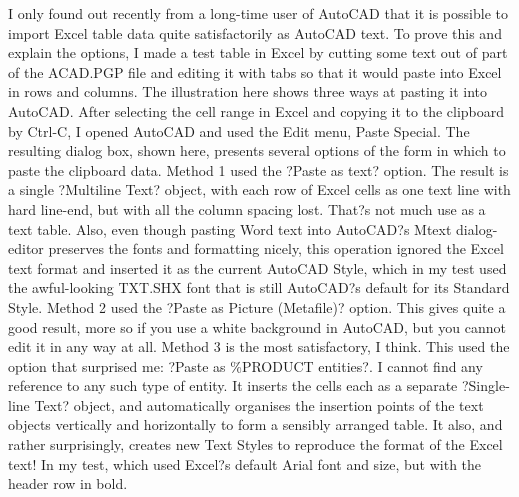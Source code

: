 \documentclass[a4paper]{article}
\begin{document}
{I only found out recently from a long-time user of AutoCAD that it is possible to import Excel table data quite satisfactorily as AutoCAD text. To prove this and explain the options, I made a test table in Excel by cutting some text out of part of the ACAD.PGP file and editing it with tabs so that it would paste into Excel in rows and columns. The illustration here shows three ways at pasting it into AutoCAD. After selecting the cell range in Excel and copying it to the clipboard by Ctrl-C, I opened AutoCAD and used the Edit menu, Paste Special. The resulting dialog box, shown here, presents several options of the form in which to paste the clipboard data.
Method 1 used the ?Paste as text? option. The result is a single ?Multiline Text? object, with each row of Excel cells as one text line with hard line-end, but with all the column spacing lost. That?s not much use as a text table. Also, even though pasting Word text into AutoCAD?s Mtext dialog-editor preserves the fonts and formatting nicely, this operation ignored the Excel text format and inserted it as the current AutoCAD Style, which in my test used the awful-looking TXT.SHX font that is still AutoCAD?s default for its Standard Style.
Method 2 used the ?Paste as Picture (Metafile)? option. This gives quite a good result, more so if you use a white background in AutoCAD, but you cannot edit it in any way at all. 
Method 3 is the most satisfactory, I think. This used the option that surprised me: ?Paste as \%PRODUCT entities?. I cannot find any reference to any such type of entity. It inserts the cells each as a separate ?Single-line Text? object, and automatically organises the insertion points of the text objects vertically and horizontally to form a sensibly arranged table. It also, and rather surprisingly, creates new Text Styles to reproduce the format of the Excel text! In my test, which used Excel?s default Arial font and size, but with the header row in bold.
}
\end{document}
